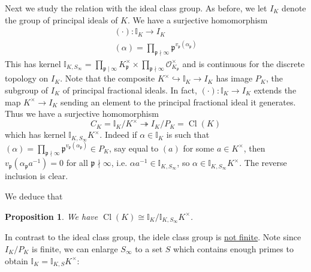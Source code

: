 \documentclass[11pt]{article}
\theoremstyle{definition}
\theoremstyle{plain}
\newtheorem{proposition}[definition]{Proposition}
\theoremstyle{remark}
\DeclareMathOperator{\Cl}{Cl}
\newcommand{\II}{\mathbb{I}}
\newcommand{\cO}{\mathcal{O}}
\newcommand{\fp}{\mathfrak{p}}
\begin{document}
Next we study the relation with the ideal class group. As before, we let $I_K$ denote the group of principal ideals of $K$. We have a surjective homomorphism
\begin{gather*}
    (\cdot) : \II_K \to I_K\\
    (\alpha) = \prod_{\fp \nmid \infty} \fp^{v_\fp(\alpha_\fp)}
\end{gather*}
This has kernel $\II_{K, S_\infty} = \prod_{\fp \mid \infty} K_\fp^\times \times \prod_{\fp \nmid \infty} \cO_{K_\fp}^\times$ and is continuous for the discrete topology on $I_K$. Note that the composite $K^\times \hookrightarrow \II_K \to I_K$ has image $P_K$, the subgroup of $I_K$ of principal fractional ideals. {\color{blue} In fact, $(\cdot) : \II_K \to I_K$ extends the map $K^\times \to I_K$ sending an element to the principal fractional ideal it generates.} Thus we have a surjective homomorphism
\begin{equation*}
    C_K = \II_K / K^\times \twoheadrightarrow I_K / P_K = \Cl(K)
\end{equation*}
which has kernel $\II_{K, S_\infty} K^\times$. {\color{blue} Indeed if $\alpha \in \II_K$ is such that $(\alpha) = \prod_{\fp \nmid \infty} \fp^{v_\fp(\alpha_\fp)} \in P_K$, say equal to $(a)$ for some $a \in K^\times$, then $v_\fp(\alpha_\fp a^{-1}) = 0$ for all $\fp \nmid \infty$, i.e. $\alpha a^{-1} \in \II_{K, S_\infty}$, so $\alpha \in \II_{K, S_\infty} K^\times$. The reverse inclusion is clear.}

We deduce that

\begin{proposition}\label{prop:9_9}
    We have $\Cl(K) \cong \II_K / \II_{K, S_\infty} K^\times$.
\end{proposition}

In contrast to the ideal class group, the idele class group is \underline{not finite}. Note since $I_K / P_K$ is finite, we can enlarge $S_\infty$ to a set $S$ which contains enough primes to obtain $\II_K = \II_{K,S} K^\times$:
\end{document}
